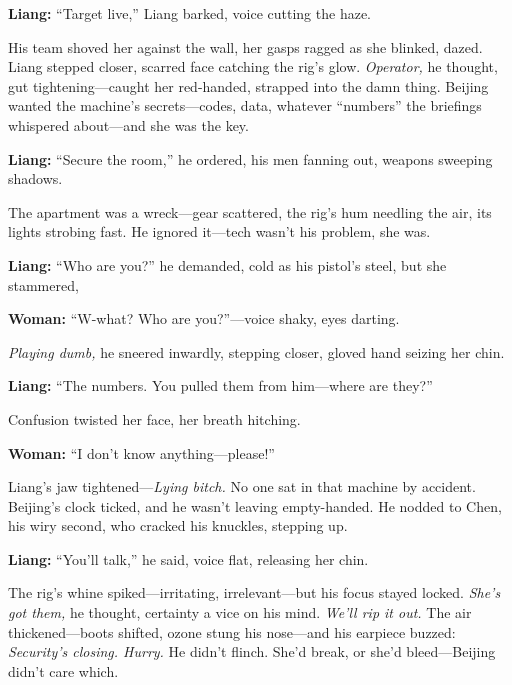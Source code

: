 \documentclass[12pt]{book}
\begin{document}
\vspace{0.5em}
\textbf{Liang:} “Target live,” Liang barked, voice cutting the haze.

His team shoved her against the wall, her gasps ragged as she blinked, dazed. Liang stepped closer, scarred face catching the rig’s glow. \emph{Operator,} he thought, gut tightening—caught her red-handed, strapped into the damn thing. Beijing wanted the machine’s secrets—codes, data, whatever “numbers” the briefings whispered about—and she was the key. 

\vspace{0.5em}
\textbf{Liang:} “Secure the room,” he ordered, his men fanning out, weapons sweeping shadows.

The apartment was a wreck—gear scattered, the rig’s hum needling the air, its lights strobing fast. He ignored it—tech wasn’t his problem, she was. 

\vspace{0.5em}
\textbf{Liang:} “Who are you?” he demanded, cold as his pistol’s steel, but she stammered, 

\vspace{0.5em}
\textbf{Woman:} “W-what? Who are you?”—voice shaky, eyes darting.

\emph{Playing dumb,} he sneered inwardly, stepping closer, gloved hand seizing her chin. 

\vspace{0.5em}
\textbf{Liang:} “The numbers. You pulled them from him—where are they?”

Confusion twisted her face, her breath hitching. 

\vspace{0.5em}
\textbf{Woman:} “I don’t know anything—please!”

Liang’s jaw tightened—\emph{Lying bitch.} No one sat in that machine by accident. Beijing’s clock ticked, and he wasn’t leaving empty-handed. He nodded to Chen, his wiry second, who cracked his knuckles, stepping up. 

\vspace{0.5em}
\textbf{Liang:} “You’ll talk,” he said, voice flat, releasing her chin.

The rig’s whine spiked—irritating, irrelevant—but his focus stayed locked. \emph{She’s got them,} he thought, certainty a vice on his mind. \emph{We’ll rip it out.} The air thickened—boots shifted, ozone stung his nose—and his earpiece buzzed: \emph{Security’s closing. Hurry.} He didn’t flinch. She’d break, or she’d bleed—Beijing didn’t care which.
\end{document}
